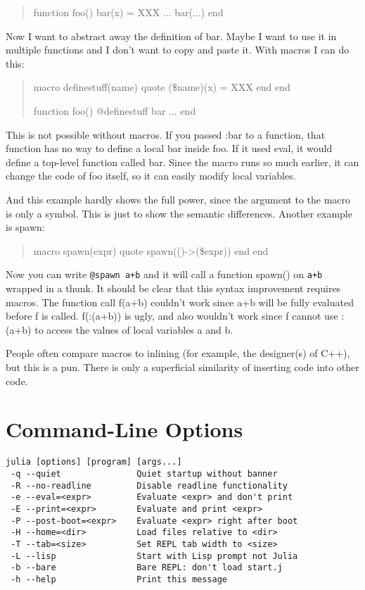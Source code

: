 \documentclass{article}
\renewcommand{\sec}[1]{\label{sec:#1}}
\begin{document}
\begin{quote}
function foo()
  bar(x) = XXX
  ...
  bar(...)
end
\end{quote}

Now I want to abstract away the definition of bar. Maybe I want to use
it in multiple functions and I don't want to copy and paste it. With
macros I can do this:

\begin{quote}
macro definestuff(name)
  quote
    (\$name)(x) = XXX
  end
end

function foo()
  @definestuff bar
  ...
end
\end{quote}

This is not possible without macros. If you passed :bar to a function,
that function has no way to define a local bar inside foo. If it used
eval, it would define a top-level function called bar. Since the macro
runs so much earlier, it can change the code of foo itself, so it can
easily modify local variables.

And this example hardly shows the full power, since the argument to
the macro is only a symbol. This is just to show the semantic
differences.  Another example is spawn:

\begin{quote}
macro spawn(expr)
  quote
    spawn(()->(\$expr))
  end
end
\end{quote}

Now you can write {\tt @spawn a+b} and it will call a function spawn()
on {\tt a+b} wrapped in a thunk. It should be clear that this syntax
improvement requires macros. The function call f(a+b) couldn't work
since a+b will be fully evaluated before f is called. f(:(a+b)) is
ugly, and also wouldn't work since f cannot use :(a+b) to access the
values of local variables a and b.

People often compare macros to inlining (for example, the designer(s)
of C++), but this is a pun. There is only a superficial similarity of
inserting code into other code.

\section{Command-Line Options}
\sec{command-line-options}

\begin{verbatim}
julia [options] [program] [args...]
 -q --quiet               Quiet startup without banner
 -R --no-readline         Disable readline functionality
 -e --eval=<expr>         Evaluate <expr> and don't print
 -E --print=<expr>        Evaluate and print <expr>
 -P --post-boot=<expr>    Evaluate <expr> right after boot
 -H --home=<dir>          Load files relative to <dir>
 -T --tab=<size>          Set REPL tab width to <size>
 -L --lisp                Start with Lisp prompt not Julia
 -b --bare                Bare REPL: don't load start.j
 -h --help                Print this message
\end{verbatim}
\end{document}

